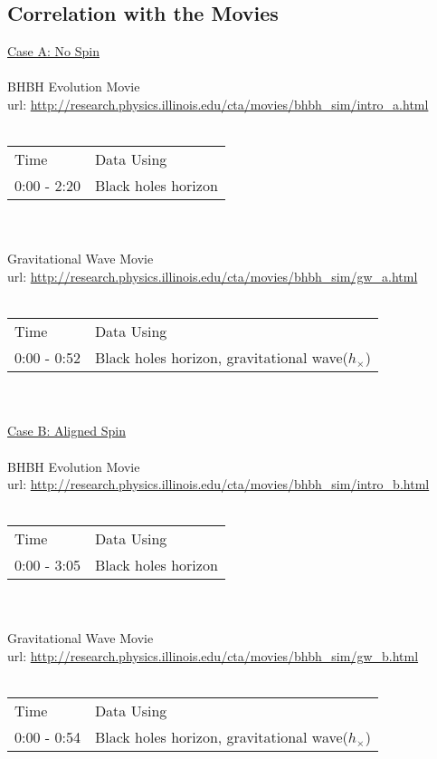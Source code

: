 \documentclass{article}
\begin{document}
\subsection{Correlation with the Movies}
\underline{Case A: No Spin} \\
\\
BHBH Evolution Movie \\
url: \url{http://research.physics.illinois.edu/cta/movies/bhbh_sim/intro_a.html} \\
\\
\begin{tabular}{l l}
Time		& Data Using \\
0:00 - 2:20	& Black holes horizon \\
\end{tabular}
\\
\\
Gravitational Wave Movie \\
url: \url{http://research.physics.illinois.edu/cta/movies/bhbh_sim/gw_a.html} \\
\\
\begin{tabular}{l l}
Time		& Data Using \\
0:00 - 0:52	& Black holes horizon, gravitational wave($h_\times$) \\
\end{tabular}
\\
\\
\underline{Case B: Aligned Spin} \\
\\
BHBH Evolution Movie \\
url: \url{http://research.physics.illinois.edu/cta/movies/bhbh_sim/intro_b.html} \\
\\
\begin{tabular}{l l}
Time		& Data Using \\
0:00 - 3:05	& Black holes horizon \\
\end{tabular}
\\
\\
Gravitational Wave Movie \\
url: \url{http://research.physics.illinois.edu/cta/movies/bhbh_sim/gw_b.html} \\
\\
\begin{tabular}{l l}
Time		& Data Using \\
0:00 - 0:54	& Black holes horizon, gravitational wave($h_\times$) \\
\end{tabular}
\end{document}
